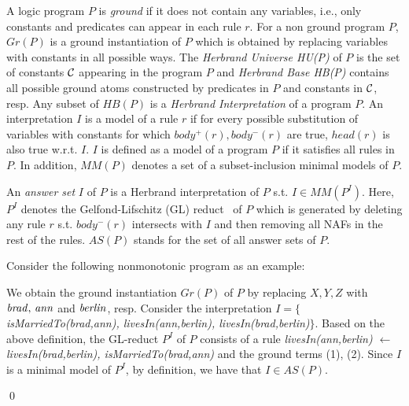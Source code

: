 A logic program $P$ is \textit{ground} if it does not contain any variables, i.e., only constants and predicates can appear in each rule $r$. For a non ground program $P$, $Gr(P)$ is a ground instantiation of $P$ which is obtained by replacing variables with constants in all possible ways. The \textit{Herbrand Universe HU(P)} of $P$ is the set of constants $\mathcal{C}$ appearing in the program $P$ and \textit{Herbrand Base HB(P)} contains all possible ground atoms constructed by predicates in $P$ and constants in $\mathcal{C}$, resp. Any subset of $HB(P)$ is a \textit{Herbrand Interpretation} of a program $P$. An interpretation $I$ is a model of a rule $r$ if for every possible substitution of variables with constants for which $body^+(r), body^-(r)$ are true, $head(r)$ is also true w.r.t. $I$. $I$ is defined as a model of a program $P$ if it satisfies all rules in $P$. In addition, $MM(P)$ denotes a set of a subset-inclusion minimal models of $P$.

An \textit{answer set} $I$ of $P$ is a Herbrand interpretation of $P$ s.t. $I \in MM(P^I)$. Here, $P^I$ denotes the Gelfond-Lifschitz (GL) reduct~\cite{ref50} of $P$ which is generated by deleting any rule $r$ s.t. $body^-(r)$ intersects with $I$ and then removing all NAFs in the rest of the rules. $AS(P)$ stands for the set of all answer sets of $P$.

\begin{example}\label{ex:as}
Consider the following nonmonotonic program as an example:\\
{\small {}}

\normalsize
{\smallskip

\noindent            
We obtain the ground instantiation $Gr(P)$ of $P$ by replacing $X,Y,Z$ with $\mathit{brad, \,ann}$ and $\mathit{berlin}$, resp. Consider the interpretation $I=\{${\small\textit{isMarriedTo(brad,ann), livesIn(ann,berlin), livesIn(brad,berlin)}}$\}$. Based on the above definition, the GL-reduct $P^I$ of $P$ consists of a rule \textit{livesIn(ann,berlin) $\leftarrow$ livesIn(brad,berlin), isMarriedTo(brad,ann)} and the ground terms (1), (2). Since $I$ is a minimal model of $P^I$, by definition, we have that $I \in AS(P)$.}\qed
\end{example}

